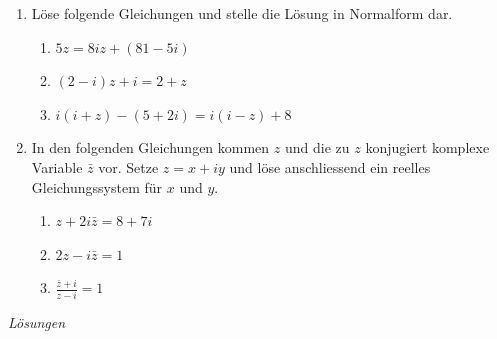 \begin{ueb}
{}{}
\begin{enumerate}
    \item Löse folgende Gleichungen und stelle die Lösung in Normalform dar.
    \begin{enumerate}
        \item $5z = 8iz + (81 - 5i)$
        \item $(2 - i)z + i = 2 + z$
        \item $i(i + z) - (5 + 2i) = i(i - z) + 8$
    \end{enumerate}

    \item In den folgenden Gleichungen kommen $z$ und die zu $z$ konjugiert komplexe Variable $\bar{z}$ vor. Setze $z = x + iy$ und löse anschliessend ein reelles Gleichungssystem für $x$ und $y$.
    \begin{enumerate}
        \item $z + 2i \bar{z} = 8 + 7i$
        \item $2z - i \bar{z} = 1$
        \item $\frac{\bar{z} + i}{z - i} = 1$
        
    \end{enumerate}
\end{enumerate}
\end{ueb}
\clearpage
\emph{Lösungen}
